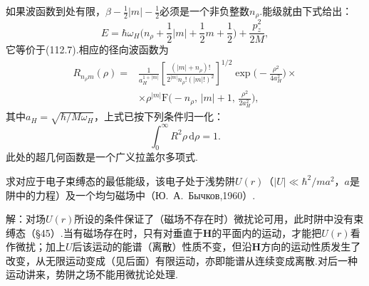 \begin{xiti}
\begin{equation*}
\end{equation*}
如果波函数到处有限，$\beta-\frac{1}{2}|m|-\frac{1}{2}$必须是一个非负整数$n_\rho$.能级就由下式给出：
\begin{equation*}
  E=\hbar\omega_H\biggl(n_\rho+\frac{1}{2}|m|+\frac{1}{2}m+\frac{1}{2}\biggr)
  +\frac{p_z^2}{2M},
\end{equation*}
它等价于(112.7).相应的径向波函数为
\begin{equation}
\begin{aligned}
  R_{n_\rho m}(\rho)={}&\frac{1}{a_H^{1+|m|}}
  \left[\frac{(|m|+n_\rho)!}{2^{|m|}n_\rho!(|m|!)^2}\right]^{1/2}
  \exp\biggl(-\frac{\rho^2}{4a_H^2}\biggr)\times\\
  &\times\rho^{|m|}\mathrm{F}\biggl(-n_\rho,\,|m|+1,\,\frac{\rho^2}{2a_H^2}\biggr),
\end{aligned}
\end{equation}
其中$a_H=\sqrt{\hbar/M\omega_H}$，上式已按下列条件归一化：
\begin{equation*}
  \int_0^{\infty}R^2\rho\,\mathrm{d}\rho=1.
\end{equation*}
此处的超几何函数是一个广义拉盖尔多项式.

\quad 求对应于电子束缚态的最低能级，该电子处于浅势阱$U(r)$（$|U|\ll\hbar^2/ma^2$，$a$是阱中的力程）及一个均匀磁场中（Ю.~А.~Бычков,1960）.

解：对场$U(r)$所设的条件保证了（磁场不存在时）微扰论可用，此时阱中没有束缚态（§45）.当有磁场存在时，只有对垂直于$\boldsymbol{H}$的平面内的运动，才能把$U(r)$看作微扰；加上$U$后该运动的能谱（离散）性质不变，但沿$\boldsymbol{H}$方向的运动性质发生了改变，从无限运动变成（见后面）有限运动，亦即能谱从连续变成离散.对后一种运动讲来，势阱之场不能用微扰论处理.


\end{xiti}
